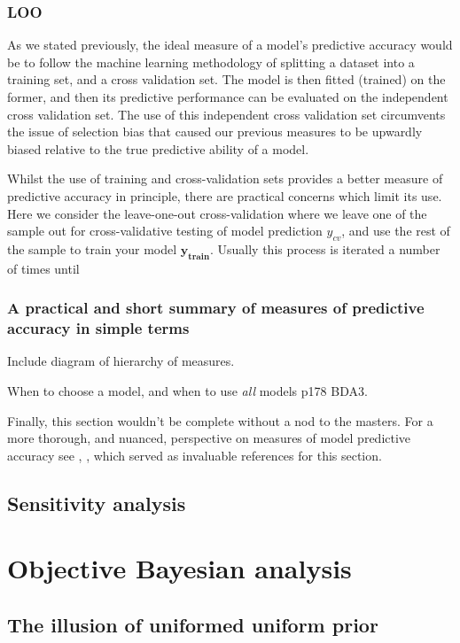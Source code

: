 \documentclass[11pt,fullpage]{book}
\begin{document}
\subsection{LOO}
As we stated previously, the ideal measure of a model's predictive accuracy would be to follow the machine learning methodology of splitting a dataset into a training set, and a cross validation set. The model is then fitted (trained) on the former, and then its predictive performance can be evaluated on the independent cross validation set. The use of this independent cross validation set circumvents the issue of selection bias that caused our previous measures to be upwardly biased relative to the true predictive ability of a model. 

Whilst the use of training and cross-validation sets provides a better measure of predictive accuracy in principle, there are practical concerns which limit its use. Here we consider the leave-one-out cross-validation where we leave one of the sample out for cross-validative testing of model prediction $y_{cv}$, and use the rest of the sample to train your model $\boldsymbol{y_{train}}$. Usually this process is iterated a number of times until 


\subsection{A practical and short summary of measures of predictive accuracy in simple terms}\label{sec:Evaluation_practicalSimplePredictiveAcc}
Include diagram of hierarchy of measures.

When to choose a model, and when to use \textit{all} models p178 BDA3.

Finally, this section wouldn't be complete without a nod to the masters. For a more thorough, and nuanced, perspective on measures of model predictive accuracy see \cite{gelman2013bayesian}, \cite{gelman2014understanding}, which served as invaluable references for this section.

\section{Sensitivity analysis}


\chapter{Objective Bayesian analysis}\label{chap:ObjectiveBayes}
\section{The illusion of uniformed uniform prior}
\end{document}
